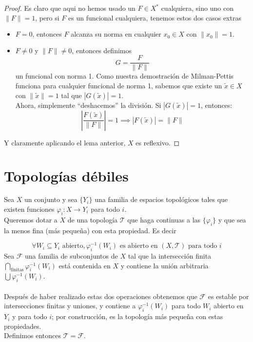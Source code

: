 \begin{teo}
\begin{proof}
    \noindent
    Es claro que aqui no hemos usado un $F\in X^*$ cualquiera, sino uno con $\|F\|=1$, pero si $F$ es un funcional cualquiera, tenemos estos dos casos extras
    \begin{itemize}
        \item $F = 0$, entonces $F$ alcanza su norma en cualquier $x_0 \in X$ con $\|x_0\|=1$.
        \item $F \neq 0$ y $\|F\| \neq 0$, entonces  definimos 
        $$G = \frac{F}{\|F\|}$$ 
        un funcional con norma 1. Como nuestra demostración de Milman-Pettis funciona para cualquier funcional de norma 1, sabemos que existe un $\tilde{x} \in X$ con $\|\tilde{x}\|=1$ tal que $|G(\tilde{x})| = 1$. \\
        \noindent
        Ahora, simplemente ``deshacemos'' la división. Si $|G(\tilde{x})| = 1$, entonces:$$\left| \frac{F(\tilde{x})}{\|F\|} \right| = 1 \implies |F(\tilde{x})| = \|F\|$$
    \end{itemize}
    Y claramente aplicando el lema anterior, $X$ es reflexivo.
\end{proof}
\end{teo}


\section{Topologías débiles}
\noindent
Sea $X$ un conjunto y sea $\{Y_i\}$ una familia de espacios topológicos tales que existen funciones $\varphi_i: X \to Y_i$ para todo $i$. \\

\noindent
Queremos dotar a $X$ de una topología $\mathcal{T}$ que haga continuas a las $\{\varphi_i\}$ y que sea la menos fina (más pequeña) con esta propiedad. Es decir

\begin{equation*}
    \forall W_i\subseteq Y_i \text{ abierto}, \varphi_i^{-1}(W_i) \text{ es abierto en } (X, \mathcal{T}) \text{ para todo } i
\end{equation*}
\noindent
Sea $\mathcal{F}$ una familia de subconjuntos de $X$ tal que la intersección finita $\bigcap\limits_{\text{finitas}} \varphi_i^{-1}(W_i)$ está contenida en $X$ y contiene la unión arbitraria $\bigcup \varphi_i^{-1}(W_i)$. \\ \\
\noindent
Después de haber realizado estas dos operaciones obtenemos que $\mathcal{F}$ es estable por intersecciones finitas y uniones, y contiene a $\varphi_i^{-1}(W_i)$ para todo $W_i$ abierto en $Y_i$ y para todo $i$; por construcción, es la topología más pequeña con estas propiedades. \\
\noindent
Definimos entonces $\mathcal{T} = \mathcal{F}$.


